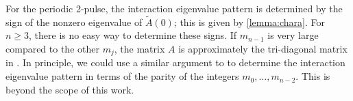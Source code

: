 \documentclass[thesis.tex]{subfiles}
\begin{document}
For the periodic 2-pulse, the interaction eigenvalue pattern is determined by the sign of the nonzero eigenvalue of $\tilde{A}(0)$; this is given by \cref{lemma:chara}. For $n \geq 3$, there is no easy way to determine these signs. If $m_{n-1}$ is very large compared to the other $m_j$, the matrix $A$ is approximately the tri-diagonal matrix in \cite[Theorem 2]{Sandstede1998}. In principle, we could use a similar argument to \cite[Theorem 3(iv)]{Sandstede1998} to determine the interaction eigenvalue pattern in terms of the parity of the integers $m_0, \dots, m_{n-2}$. This is beyond the scope of this work.

\iffulldocument\else
	
	
\fi
\end{document}
